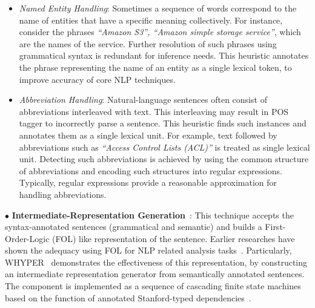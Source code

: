 
\begin{itemize}

\item \textit{Named Entity Handling}: Sometimes a sequence of words correspond to the name of entities that have a specific meaning collectively.
For instance, consider the phrases \textit{``Amazon S3'', ``Amazon simple storage service''}, which are the names of the service.
Further resolution of such phrases using grammatical syntax is redundant for inference needs.
This heuristic annotates the phrase representing the name of an entity as a single lexical token,
to improve accuracy of core NLP techniques.
	
\item \textit{Abbreviation Handling}: Natural-language sentences often consist of abbreviations interleaved with text.
This interleaving may result in POS tagger to incorrectly parse a sentence.
This heuristic finds such instances and annotates them as a single lexical unit.
For example, text followed by abbreviations such as \textit{``Access Control Lists (ACL)''} is treated as single lexical unit.
Detecting such abbreviations is achieved by using the common structure of abbreviations and encoding such structures into regular expressions.
Typically, regular expressions provide a reasonable approximation for handling abbreviations.  

\end{itemize}

{\small $\bullet$} \textbf{Intermediate-Representation Generation}~\cite{pandita13:WHYPER}:
This technique accepts the syntax-annotated sentences (grammatical and semantic) and builds a First-Order-Logic (FOL) like representation of the sentence.
Earlier researches have shown the adequacy using FOL for NLP related analysis tasks~\cite{Sinha2009,Sinha2010,pandita12:inferring}.
Particularly, WHYPER~\cite{pandita13:WHYPER} demonstrates the effectiveness of this representation, by constructing an intermediate representation generator from semantically annotated sentences. 
The component is implemented as a sequence of cascading finite state machines based on the function of annotated Stanford-typed dependencies~\cite{Marneffe06LREC,Marneffe08COLING,Klein03,KleinNIPS03}.
